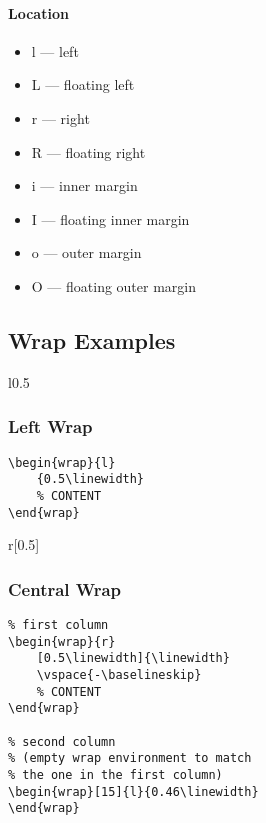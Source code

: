 \documentclass[itdr]{subfiles}
\begin{document}
\begin{minipage}{\textwidth}
\paragraph{Location}

\begin{itemize}
	\item l --- left
	\item L --- floating left
	\item r --- right
	\item R --- floating right
	\item i --- inner margin
	\item I --- floating inner margin
	\item o --- outer margin
	\item O --- floating outer margin
\end{itemize}


\end{minipage}

\clearpage

\subsection{Wrap Examples}

\begin{wrap}{l}{0.5\linewidth}
\vspace{-\baselineskip}
\subsubsection{Left Wrap}
\begin{lstlisting}
\begin{wrap}{l}
	{0.5\linewidth}
	% CONTENT
\end{wrap}
\end{lstlisting}
\end{wrap}

\lipsum[1]

\begin{wrap}{r}[0.5\linewidth]{\linewidth}
\vspace{-\baselineskip}
\subsubsection{Central Wrap}
\begin{lstlisting}
% first column
\begin{wrap}{r}
	[0.5\linewidth]{\linewidth}
	\vspace{-\baselineskip}
	% CONTENT
\end{wrap}

% second column
% (empty wrap environment to match
% the one in the first column)
\begin{wrap}[15]{l}{0.46\linewidth}
\end{wrap}
\end{lstlisting}
\end{wrap}
\end{document}
